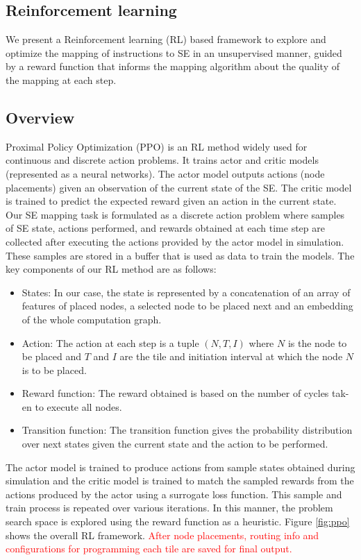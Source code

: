 \subsection{Reinforcement learning}

We present a Reinforcement learning (RL) based framework to explore and optimize the mapping of instructions to SE in an unsupervised manner, guided by a reward function that informs the mapping algorithm about the quality of the mapping at each step. 

\subsection{Overview}
Proximal Policy Optimization (PPO) is an RL method widely used for continuous and discrete action problems. It trains actor and critic models (represented as a neural networks). 
The actor model outputs actions (node placements) given an observation of the current state of the SE. The critic model is trained to predict the expected reward given an action in the current state. 
Our SE mapping task is formulated as a discrete action problem where samples of SE state, actions performed, and rewards obtained at each time step are collected after executing the actions provided by the actor model in simulation. These samples are stored in a buffer that is used as data to train the models. 
The key components of our RL method are as follows:
\begin{itemize}
  \item States: In our case, the state is represented by a concatenation of an array of features of placed nodes, a selected node to be placed next and an embedding of the whole computation graph. 
  \item Action: The action at each step is a tuple \((N,T,I)\) where $N$ is the node to be placed and $T$ and $I$ are the tile and initiation interval at which the node $N$ is to be placed.
  \item Reward function: The reward obtained is based on the number of cycles tak-en to execute all nodes.
  \item Transition function: The transition function gives the probability distribution over next states given the current state and the action to be performed.
\end{itemize}


 The actor model is trained to produce actions from sample states obtained during simulation and the critic model is trained to match the sampled rewards from the actions produced by the actor using a surrogate loss function. This sample and train process is repeated over various iterations. In this manner, the problem search space is explored using the reward function as a heuristic.
Figure \ref{fig:ppo} shows the overall RL framework. 
\textcolor{red}{After node placements, routing info and configurations for programming each tile are saved for final output.}

